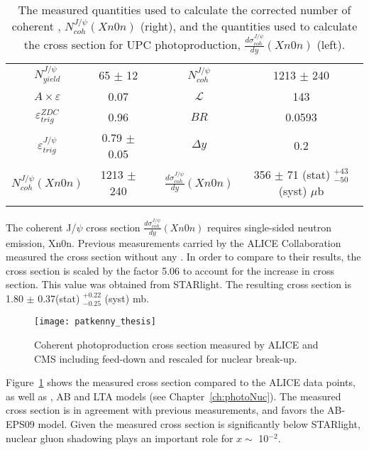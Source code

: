     \begin{table}
      \centering
      \begin{tabular}{|c|c|c|c|c|} \hhline{--~--} 
        $N^{J/\psi}_{yield}$ & 65 $\pm$ 12 & & $N^{J/\psi}_{coh}$  & 1213 $\pm$ 240 \\ \hhline{--~--}  
        $A\times \varepsilon$ & 0.07 & & $\mathcal{L}$ & 143 \\ \hhline{--~--}
        $\varepsilon^{ZDC}_{trig}$ & 0.96 & & $BR$ & 0.0593 \\ \hhline{--~--}
        $\varepsilon^{J/\psi}_{trig}$ & 0.79 $\pm$ 0.05 & & $\Delta y$ & 0.2 \\ \hhline{--~--} \hhline{--~--}
        $N^{J/\psi{}}_{coh} (Xn0n)$ & 1213 $\pm$ 240 & & $\frac{d\sigma^{J/\psi}_{coh}}{dy} (Xn0n)$ & 356 $\pm$ 71 (stat) $^{+43}_{-50}$ (syst) $\mu$b \\  \hhline{--~--}
      \end{tabular}
      \caption{\label{tab:nJpCoh}The measured quantities used to calculate the 
        corrected number of coherent \JPsi{}, $N^{J/\psi}_{coh} (Xn0n)$ (right),
        and the quantities used to calculate the cross section for UPC \JPsi{} 
        photoproduction, $\frac{d\sigma^{J/\psi}_{coh}}{dy} (Xn0n)$ (left).}
    \end{table}  

    The coherent J/$\psi$ cross section 
      $\frac{d\sigma^{J/\psi}_{coh}}{dy} (Xn0n)$ requires single-sided neutron
      emission, Xn0n. 
    Previous measurements carried by the ALICE Collaboration measured the cross
      section without any \DIFdelbegin {}\DIFdelend \DIFaddbegin {}\DIFaddend . 
    In order to compare to their results, the cross section is scaled by the 
      factor 5.06 to account for the increase in cross section. 
    This value was obtained from STARlight. 
    The resulting cross section is 1.80 $\pm$ 0.37(stat) $^{+0.22}_{-0.25}$ (syst) mb.

    \begin{figure}[!Hhbt]
      \centering
      \texttt{[image: patkenny\_thesis]}
      \caption{Coherent \JPsi{} photoproduction cross section measured by ALICE 
        and CMS including feed-down and rescaled for nuclear break-up.}
      \label{fig:coJpXsec}
    \end{figure}
    Figure~\ref{fig:coJpXsec} shows the measured cross section compared to the 
      ALICE data points, as well as \DIFdelbegin {}\DIFdelend \DIFaddbegin {}\DIFaddend , AB and LTA models 
      (see Chapter~\ref{ch:photoNuc}). 
    The measured cross section is in agreement with previous measurements, and 
      favors the AB-EPS09 model. 
    Given the measured cross section is significantly below STARlight, nuclear 
      gluon shadowing plays an important role for $x\sim$ 10$^{-2}$. 

